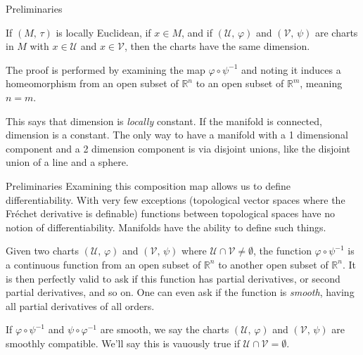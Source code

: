 \documentclass{beamer}
\begin{document}
    \begin{frame}{Preliminaries}
        \begin{theorem}
            If $(M,\,\tau)$ is locally Euclidean, if $x\in{M}$, and if
            $(\mathcal{U},\,\varphi)$ and $(\mathcal{V},\,\psi)$ are charts in
            $M$ with $x\in\mathcal{U}$ and $x\in\mathcal{V}$, then the charts
            have the same dimension.
        \end{theorem}
        The proof is performed by examining the map $\varphi\circ\psi^{-1}$ and
        noting it induces a homeomorphism from an open subset of
        $\mathbb{R}^{n}$ to an open subset of $\mathbb{R}^{m}$, meaning $n=m$.
        \par\hfill\par
        This says that dimension is \textit{locally} constant. If the manifold
        is connected, dimension is a constant. The only way to have a manifold
        with a 1 dimensional component and a 2 dimension component is via
        disjoint unions, like the disjoint union of a line and a sphere.
    \end{frame}
    \begin{frame}{Preliminaries}
        Examining this composition map allows us to define differentiability.
        With very few exceptions (topological vector spaces where the
        Fr\'{e}chet derivative is definable) functions between topological
        spaces have no notion of differentiability. Manifolds have the ability
        to define such things.
        \par\hfill\par
        Given two charts $(\mathcal{U},\,\varphi)$ and $(\mathcal{V},\,\psi)$
        where $\mathcal{U}\cap\mathcal{V}\ne\emptyset$, the function
        $\varphi\circ\psi^{-1}$ is a continuous function from an open subset of
        $\mathbb{R}^{n}$ to another open subset of $\mathbb{R}^{n}$. It is then
        perfectly valid to ask if this function has partial derivatives, or
        second partial derivatives, and so on. One can even ask if the function
        is \textit{smooth}, having all partial derivatives of all orders.
        \par\hfill\par
        If $\varphi\circ\psi^{-1}$ and $\psi\circ\varphi^{-1}$ are smooth, we
        say the charts $(\mathcal{U},\,\varphi)$ and $(\mathcal{V},\,\psi)$ are
        smoothly compatible. We'll say this is vauously true if
        $\mathcal{U}\cap\mathcal{V}=\emptyset$.
    \end{frame}
\end{document}
